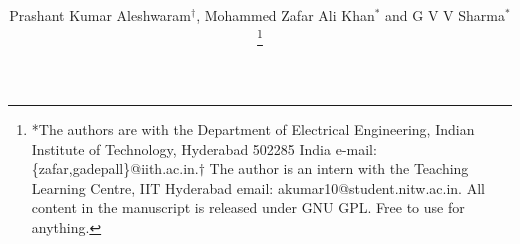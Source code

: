 \documentclass[journal,12pt,twocolumn]{IEEEtran}
\begin{document}

\def\putbox#1#2#3{\makebox[0in][l]{\makebox[#1][l]{}\raisebox{\baselineskip}[0in][0in]{\raisebox{#2}[0in][0in]{#3}}}}
     \def\rightbox#1{\makebox[0in][r]{#1}}
     \def\centbox#1{\makebox[0in]{#1}}
     \def\topbox#1{\raisebox{-\baselineskip}[0in][0in]{#1}}
     \def\midbox#1{\raisebox{-0.5\baselineskip}[0in][0in]{#1}}

\vspace{3cm}

\title{ 
}


%
%
%

\author{Prashant Kumar Aleshwaram$^{\dagger}$, Mohammed Zafar Ali Khan$^{*}$ and G V V Sharma$^{*}$ %
\thanks{*The authors are with the Department
of Electrical Engineering, Indian Institute of Technology, Hyderabad
502285 India e-mail:  \{zafar,gadepall\}@iith.ac.in.$\dagger$ The author is an intern with the Teaching Learning Centre, IIT Hyderabad email: akumar10@student.nitw.ac.in. All content in the manuscript is released under GNU GPL.  Free to use for anything. }%
}
% 
%
\end{document}
